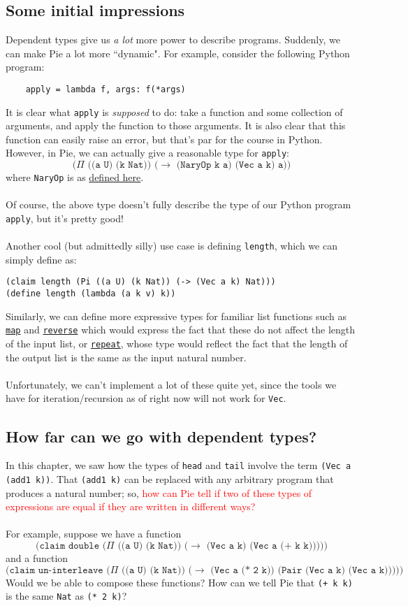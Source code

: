 \documentclass{article}
\newcommand{\ttt}[1]{\texttt{#1}}
\begin{document}
\subsection{Some initial impressions}
Dependent types give us \textit{a lot} more power to describe programs. Suddenly, we can make Pie a lot more ``dynamic". For example, consider the following Python program:
\begin{verbatim}
    apply = lambda f, args: f(*args)
\end{verbatim}
It is clear what \ttt{apply} is \textit{supposed} to do: take a function and some collection of arguments, and apply the function to those arguments. It is also clear that this function can easily raise an error, but that's par for the course in Python. However, in Pie, we can actually give a reasonable type for \ttt{apply}: \[
    \ttt{(\(\Pi\) ((a U) (k Nat)) (\(\to\) (NaryOp k a) (Vec a k) a))}
\] where \ttt{NaryOp} is as \hyperref[code:NaryOp]{defined here}. 
\\ \\
Of course, the above type doesn't fully describe the type of our Python program \ttt{apply}, but it's pretty good!
\\ \\
Another cool (but admittedly silly) use case is defining \ttt{length}, which we can simply define as:
\begin{verbatim}
(claim length (Pi ((a U) (k Nat)) (-> (Vec a k) Nat)))
(define length (lambda (a k v) k))
\end{verbatim}
Similarly, we can define more expressive types for familiar list functions such as \hyperref[code:map]{\ttt{map}} and \hyperref[code:reverse]{\ttt{reverse}} which would express the fact that these do not affect the length of the input list, or \hyperref[code:repeat]{\ttt{repeat}}, whose type would reflect the fact that the length of the output list is the same as the input natural number.
\\ \\
Unfortunately, we can't implement a lot of these quite yet, since the tools we have for iteration/recursion as of right now will not work for \ttt{Vec}.
\subsection{How far can we go with dependent types?}
In this chapter, we saw how the types of \ttt{head} and \ttt{tail} involve the term \ttt{(Vec a (add1 k))}. That \ttt{(add1 k)} can be replaced with any arbitrary program that produces a natural number; so, \textcolor{red}{how can Pie tell if two of these types of expressions are equal if they are written in different ways?}
\\ \\
For example, suppose we have a function \[
    \ttt{(claim double (\(\Pi\) ((a U) (k Nat)) (\(\to\) (Vec a k) (Vec a (+ k k)))))}
\]
and a function \[
    \ttt{(claim un-interleave (\(\Pi\) ((a U) (k Nat)) (\(\to\) (Vec a (* 2 k)) (Pair (Vec a k) (Vec a k)))))}
\]
Would we be able to compose these functions? How can we tell Pie that \ttt{(+ k k)} is the same \ttt{Nat} as \ttt{(* 2 k)}?
\end{document}
